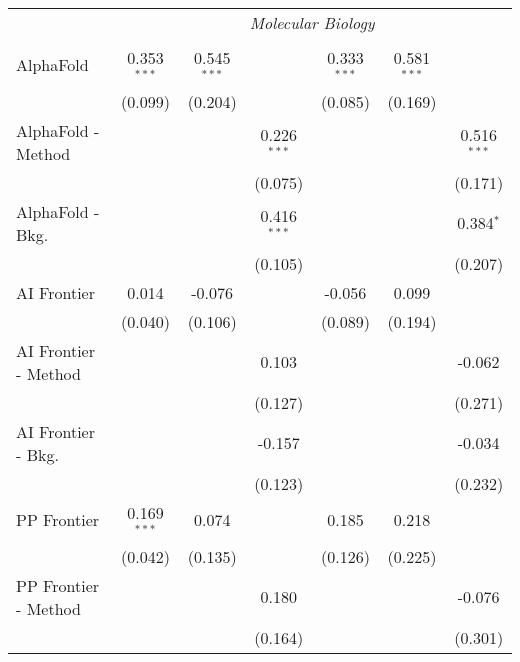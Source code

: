 \begin{tabular}{lcccccc}
 & \multicolumn{6}{c}{\textit{Molecular Biology}} \\ \\
   AlphaFold            & 0.353$^{***}$ & 0.545$^{***}$ &               & 0.333$^{***}$ & 0.581$^{***}$ &   \\   
                        & (0.099)       & (0.204)       &               & (0.085)       & (0.169)       &   \\   
   AlphaFold - Method   &               &               & 0.226$^{***}$ &               &               & 0.516$^{***}$\\   
                        &               &               & (0.075)       &               &               & (0.171)\\   
   AlphaFold - Bkg.     &               &               & 0.416$^{***}$ &               &               & 0.384$^{*}$\\   
                        &               &               & (0.105)       &               &               & (0.207)\\   
   AI Frontier          & 0.014         & -0.076        &               & -0.056        & 0.099         &   \\   
                        & (0.040)       & (0.106)       &               & (0.089)       & (0.194)       &   \\   
   AI Frontier - Method &               &               & 0.103         &               &               & -0.062\\   
                        &               &               & (0.127)       &               &               & (0.271)\\   
   AI Frontier - Bkg.   &               &               & -0.157        &               &               & -0.034\\   
                        &               &               & (0.123)       &               &               & (0.232)\\   
   PP Frontier          & 0.169$^{***}$ & 0.074         &               & 0.185         & 0.218         &   \\   
                        & (0.042)       & (0.135)       &               & (0.126)       & (0.225)       &   \\   
   PP Frontier - Method &               &               & 0.180         &               &               & -0.076\\   
                        &               &               & (0.164)       &               &               & (0.301)\\   

\end{tabular}
